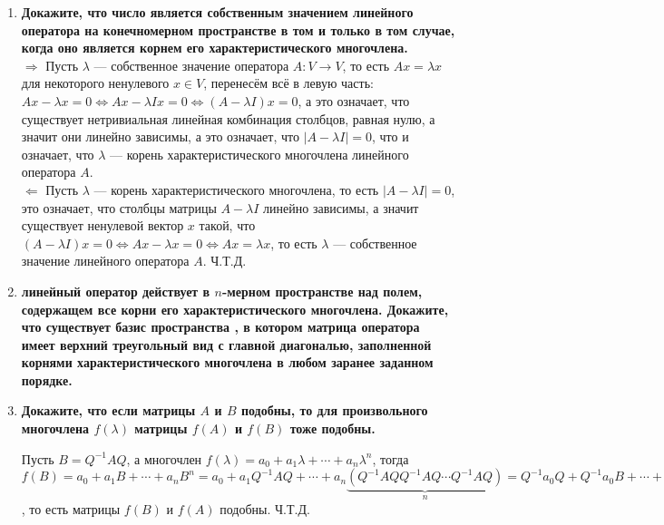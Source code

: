 \documentclass[12pt]{article} %
\begin{document}
\begin{enumerate}
    Таким образом как бы мы не выбирали подпространство пространства многочленов минимальное инвариантное пространство, содержащее его это $M_n$ и пространство само является инвариантным только если оно равно $M_n$.\\

    Ответ: инвариантными будут все подпространства $M_n, n \in \mathds{N} + {0}$ и никакие другие.
    \item \textbf{Докажите, что число является собственным значением линейного оператора на конечномерном пространстве в том и только в том случае, когда оно является корнем его характеристического многочлена.}\\

    $\Rightarrow$ Пусть $\lambda$ --- собственное значение оператора $A: V \rightarrow V$, то есть $Ax = \lambda x$ для некоторого ненулевого $x \in V$, перенесём всё в левую часть: $Ax - \lambda x = 0 \Leftrightarrow Ax - \lambda I x = 0 \Leftrightarrow (A - \lambda I)x = 0$, а это означает, что существует нетривиальная линейная комбинация столбцов, равная нулю, а значит они линейно зависимы, а это означает, что $|A - \lambda I| = 0$, что и означает, что $\lambda$ --- корень характеристического многочлена линейного оператора $A$.\\

    $\Leftarrow$ Пусть $\lambda$ --- корень характеристического многочлена, то есть $|A - \lambda I| = 0$, это означает, что столбцы матрицы $A - \lambda I$ линейно зависимы, а значит существует ненулевой вектор $x$ такой, что $(A - \lambda I)x = 0 \Leftrightarrow Ax - \lambda x = 0 \Leftrightarrow Ax = \lambda x$, то есть $\lambda$ --- собственное значение линейного оператора $A$. Ч.Т.Д.
    
    \item \textbf{линейный оператор действует в $n$-мерном пространстве над полем, содержащем все корни его характеристического многочлена. Докажите, что существует базис пространства , в котором матрица оператора имеет верхний треугольный вид с главной диагональю, заполненной корнями характеристического многочлена в любом заранее заданном порядке.}

    
    \item \textbf{Докажите, что если матрицы $A$ и $B$ подобны, то для произвольного многочлена $f(\lambda)$ матрицы $f(A)$ и $f(B)$ тоже подобны.}

    Пусть $B = Q^{-1}AQ$, а многочлен $f(\lambda) = a_0 + a_1 \lambda + \cdots + a_n \lambda^n$, тогда $f(B) = a_0 + a_1B + \cdots + a_nB^n = a_0 + a_1 Q^{-1}AQ + \cdots + a_n \underbrace{(Q^{-1}AQQ^{-1}AQ \cdots Q^{-1}AQ)}_{n} = Q^{-1}a_0Q + Q^{-1}a_0B + \cdots + Q^{-1}a_nA^nQ = Q^{-1}(a_0 + a_1A + \cdots + a_nA^n)Q = Q^{-1}f(A)Q$, то есть матрицы $f(B)$ и $f(A)$ подобны. Ч.Т.Д.\\
    

\end{enumerate}
\end{document}
